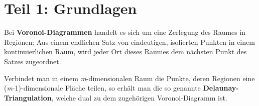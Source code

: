 \section*{Teil 1: Grundlagen}

Bei \textbf{Voronoi-Diagrammen} handelt es sich um eine Zerlegung des Raumes in Regionen: Aus einem endlichen Satz von eindeutigen, isolierten Punkten in einem kontinuierlichen Raum,
wird jeder Ort dieses Raumes dem nächsten Punkt des Satzes zugeordnet.

Verbindet man in einem \textit{m}-dimensionalen Raum die Punkte, deren Regionen eine (\textit{m}-1)-dimensionale Fläche teilen, so erhält man die so genannte \textbf{Delaunay-Triangulation},
welche dual zu dem zugehörigen Voronoi-Diagramm ist.
